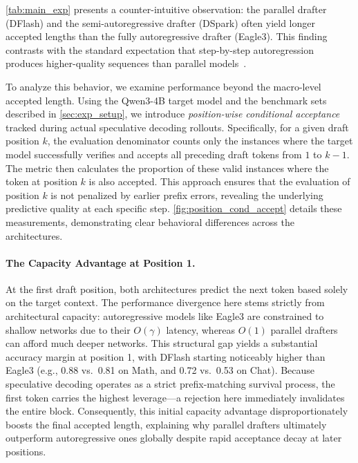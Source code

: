 \autoref{tab:main_exp} presents a counter-intuitive observation: the parallel drafter (DFlash) and the semi-autoregressive drafter (DSpark) often yield longer accepted lengths than the fully autoregressive drafter (Eagle3).
This finding contrasts with the standard expectation that step-by-step autoregression produces higher-quality sequences than parallel models~\citep{ren2020study, israel2026accelerating,zheng2025maskeddiffusionmodelssecretly}.

To analyze this behavior, we examine performance beyond the macro-level accepted length. Using the Qwen3-4B target model and the benchmark sets described in \autoref{sec:exp_setup}, we introduce \textit{position-wise conditional acceptance} tracked during actual speculative decoding rollouts. Specifically, for a given draft position $k$, the evaluation denominator counts only the instances where the target model successfully verifies and accepts all preceding draft tokens from $1$ to $k-1$. The metric then calculates the proportion of these valid instances where the token at position $k$ is also accepted. This approach ensures that the evaluation of position $k$ is not penalized by earlier prefix errors, revealing the underlying predictive quality at each specific step. \autoref{fig:position_cond_accept} details these measurements, demonstrating clear behavioral differences across the architectures.


\paragraph{The Capacity Advantage at Position 1.} 
At the first draft position, both architectures predict the next token based solely on the target context. The performance divergence here stems strictly from architectural capacity: autoregressive models like Eagle3 are constrained to shallow networks due to their $O(\gamma)$ latency, whereas $O(1)$ parallel drafters can afford much deeper networks. This structural gap yields a substantial accuracy margin at position 1, with DFlash starting noticeably higher than Eagle3 (e.g., 0.88 vs.\ 0.81 on Math, and 0.72 vs.\ 0.53 on Chat). Because speculative decoding operates as a strict prefix-matching survival process, the first token carries the highest leverage—a rejection here immediately invalidates the entire block. Consequently, this initial capacity advantage disproportionately boosts the final accepted length, explaining why parallel drafters ultimately outperform autoregressive ones globally despite rapid acceptance decay at later positions.

